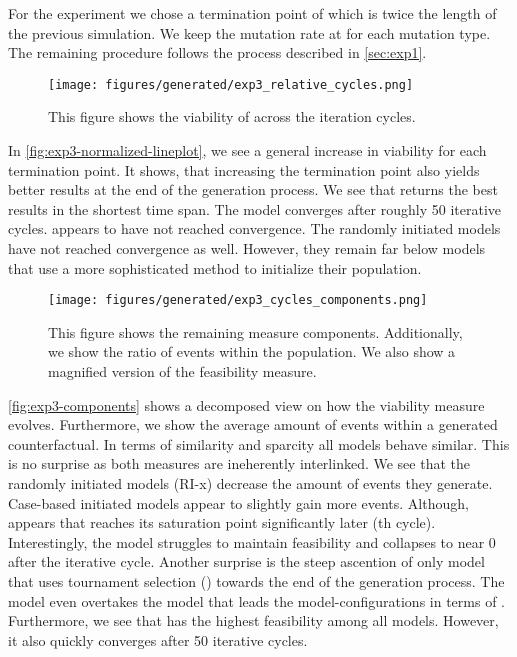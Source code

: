 \documentclass[./../../paper.tex]{subfiles}
\begin{document}
For the experiment we chose a termination point of  which is twice the length of the previous simulation. We keep the mutation rate at  for each mutation type. The remaining procedure follows the process described in \autoref{sec:exp1}.

\begin{figure}[htbp]
    \centering
    \texttt{[image: figures/generated/exp3\_relative\_cycles.png]}
    \caption{This figure shows the viability of across the iteration cycles.}
    \label{fig:exp3-normalized-lineplot}
\end{figure}

In \autoref{fig:exp3-normalized-lineplot}, we see a general increase in viability for each termination point. It shows, that increasing the termination point also yields better results at the end of the generation process. 
We see that  returns the best results in the shortest time span. The model converges after roughly 50 iterative cycles.  appears to have not reached convergence. 
The randomly initiated models have not reached convergence as well. However, they remain far below models that use a more sophisticated method to initialize their population. 

\begin{figure}[htbp]
    \centering
    \texttt{[image: figures/generated/exp3\_cycles\_components.png]}
    \caption{This figure shows the remaining measure components. Additionally, we show the ratio of events within the population. We also show a magnified version of the feasibility measure.}
    \label{fig:exp3-components}
\end{figure}

\autoref{fig:exp3-components} shows a decomposed view on how the viability measure evolves. Furthermore, we show the average amount of events within a generated counterfactual. 
In terms of similarity and sparcity all models behave similar. This is no surprise as both measures are ineherently interlinked. 
We see that the randomly initiated models (RI-x) decrease the amount of events they generate. 
Case-based initiated models appear to slightly gain more events. Although,   appears that reaches its saturation point significantly later (th cycle).
Interestingly, the  model struggles to maintain feasibility and collapses to near 0 after the  iterative cycle. 
Another surprise is the steep ascention of only model that uses tournament selection () towards the end of the generation process. The  model even overtakes the model that leads the model-configurations in terms of . 
Furthermore, we see that  has the highest feasibility among all models. However, it also quickly converges after 50 iterative cycles.    
   
\end{document}

